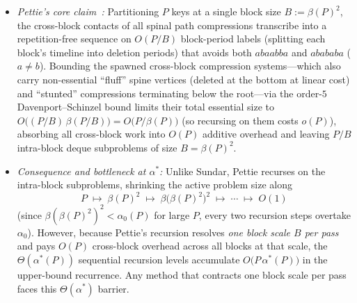\documentclass[11pt]{article}
\theoremstyle{definition}
\theoremstyle{remark}
\begin{document}
\begin{itemize}[leftmargin=2em, itemsep=2pt]
  \item \emph{Pettie's core claim~\cite[Lemmas~4.1--4.4 and Section~5]{Pettie2008}:} Partitioning $P$ keys at a single block size $B := \beta(P)^2$, the cross-block contacts of all spinal path compressions transcribe into a repetition-free sequence on $O(P / B)$ block-period labels (splitting each block's timeline into deletion periods) that avoids both $a b a a b b a$ and $a b a b a b a$ ($a \ne b$). Bounding the spawned cross-block compression systems---which also carry non-essential ``fluff'' spine vertices (deleted at the bottom at linear cost) and ``stunted'' compressions terminating below the root---via the order-$5$ Davenport--Schinzel bound limits their total essential size to $O\big((P/B)\,\beta(P/B)\big) = O\big(P / \beta(P)\big)$ (so recursing on them costs $o(P)$), absorbing all cross-block work into $O(P)$ additive overhead and leaving $P / B$ intra-block deque subproblems of size $B = \beta(P)^2$.
  \item \emph{Consequence and bottleneck at $\alpha^*$:} Unlike Sundar, Pettie recurses on the intra-block subproblems, shrinking the active problem size along
  \[
  P \;\longmapsto\; \beta(P)^2 \;\longmapsto\; \beta\big(\beta(P)^2\big)^2 \;\longmapsto\; \cdots \;\longmapsto\; O(1)
  \]
  (since $\beta(\beta(P)^2)^2 < \alpha_0(P)$ for large $P$, every two recursion steps overtake $\alpha_0$). However, because Pettie's recursion resolves \emph{one block scale $B$ per pass} and pays $O(P)$ cross-block overhead across all blocks at that scale, the $\Theta(\alpha^*(P))$ sequential recursion levels accumulate $O\big(P\,\alpha^*(P)\big)$ in the upper-bound recurrence. Any method that contracts one block scale per pass faces this $\Theta(\alpha^*)$ barrier.
\end{itemize}
\end{document}
